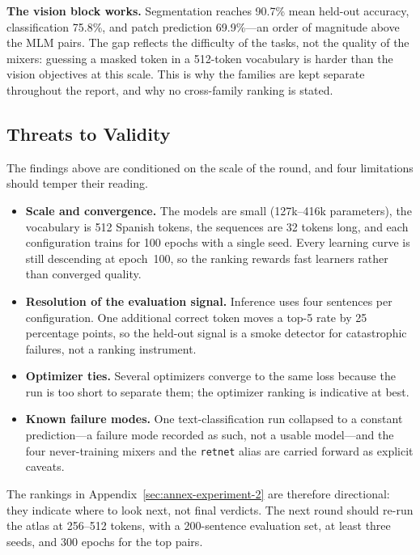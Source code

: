 \textbf{The vision block works.} Segmentation reaches 90.7\% mean held-out accuracy, classification 75.8\%, and patch prediction 69.9\%---an order of magnitude above the MLM pairs. The gap reflects the difficulty of the tasks, not the quality of the mixers: guessing a masked token in a 512-token vocabulary is harder than the vision objectives at this scale. This is why the families are kept separate throughout the report, and why no cross-family ranking is stated.

\subsection{Threats to Validity}

The findings above are conditioned on the scale of the round, and four limitations should temper their reading.

\begin{itemize}[leftmargin=*]
    \item \textbf{Scale and convergence.} The models are small (127k--416k parameters), the vocabulary is 512 Spanish tokens, the sequences are 32 tokens long, and each configuration trains for 100 epochs with a single seed. Every learning curve is still descending at epoch~100, so the ranking rewards fast learners rather than converged quality.
    \item \textbf{Resolution of the evaluation signal.} Inference uses four sentences per configuration. One additional correct token moves a top-5 rate by 25 percentage points, so the held-out signal is a smoke detector for catastrophic failures, not a ranking instrument.
    \item \textbf{Optimizer ties.} Several optimizers converge to the same loss because the run is too short to separate them; the optimizer ranking is indicative at best.
    \item \textbf{Known failure modes.} One text-classification run collapsed to a constant prediction---a failure mode recorded as such, not a usable model---and the four never-training mixers and the \texttt{retnet} alias are carried forward as explicit caveats.
\end{itemize}

The rankings in Appendix~\ref{sec:annex-experiment-2} are therefore directional: they indicate where to look next, not final verdicts. The next round should re-run the atlas at 256--512 tokens, with a 200-sentence evaluation set, at least three seeds, and 300 epochs for the top pairs.

